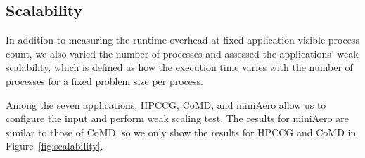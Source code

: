 \subsection{Scalability}

In addition to measuring the runtime overhead at fixed application-visible process count, we also varied the number of processes and assessed the applications' weak scalability, which is defined as how the execution time varies with the number of processes for a fixed problem size per process.

Among the seven applications, HPCCG, CoMD, and miniAero allow us to configure the input and perform weak scaling test. The results for miniAero are similar to those of CoMD, so we only show the results for HPCCG and CoMD in Figure~\ref{fig:scalability}. %


